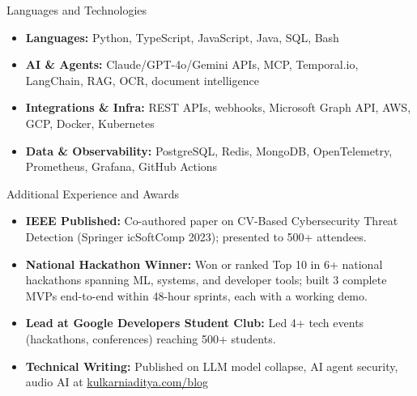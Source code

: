 \documentclass[]{mcdowellcv}
\begin{document}
\begin{cvsection}{Languages and Technologies}
  \begin{cvsubsection}{}{}{}
    \begin{itemize}
      \item \textbf{Languages:} Python, TypeScript, JavaScript, Java, SQL, Bash
      \item \textbf{AI \& Agents:} Claude/GPT-4o/Gemini APIs, MCP, Temporal.io, LangChain, RAG, OCR, document intelligence
      \item \textbf{Integrations \& Infra:} REST APIs, webhooks, Microsoft Graph API, AWS, GCP, Docker, Kubernetes
      \item \textbf{Data \& Observability:} PostgreSQL, Redis, MongoDB, OpenTelemetry, Prometheus, Grafana, GitHub Actions
    \end{itemize}
  \end{cvsubsection}
\end{cvsection}

\begin{cvsection}{Additional Experience and Awards}
  \begin{cvsubsection}{}{}{}
    \begin{itemize}
      \item \textbf{IEEE Published:} Co-authored paper on CV-Based Cybersecurity Threat Detection (Springer icSoftComp 2023); presented to 500+ attendees.
      \item \textbf{National Hackathon Winner:} Won or ranked Top 10 in 6+ national hackathons spanning ML, systems, and developer tools; built 3 complete MVPs end-to-end within 48-hour sprints, each with a working demo.
      \item \textbf{Lead at Google Developers Student Club:} Led 4+ tech events (hackathons, conferences) reaching 500+ students.
      \item \textbf{Technical Writing:} Published on LLM model collapse, AI agent security, audio AI at \href{https://www.kulkarniaditya.com/blog}{kulkarniaditya.com/blog}
    \end{itemize}
  \end{cvsubsection}
\end{cvsection}
\end{document}
